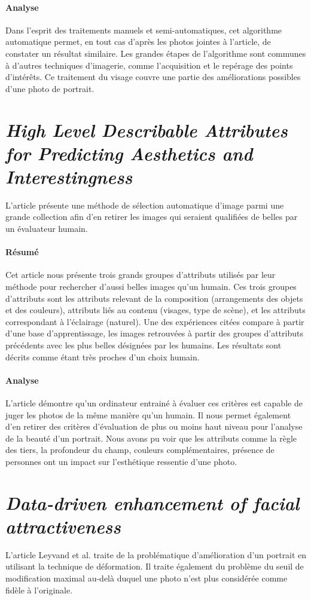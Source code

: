 \documentclass[11pt, french]{report-rd-info}
\begin{document}
\paragraph{Analyse}
Dans l'esprit des traitements manuels et semi-automatiques, cet algorithme automatique permet, en tout cas d'après les photos jointes à l'article, de constater un résultat similaire.
Les grandes étapes de l'algorithme sont communes à d'autres techniques d'imagerie, comme l'acquisition et le repérage des points d'intérêts.
Ce traitement du visage couvre une partie des améliorations possibles d'une photo de portrait.
\section{\emph{High Level Describable Attributes for Predicting Aesthetics and Interestingness}}
L'article \cite{Dhar}  présente une méthode de sélection automatique d'image parmi une grande collection afin d'en retirer les images qui seraient qualifiées de belles par un évaluateur humain.
\paragraph{Résumé}
Cet article nous présente trois grands groupes d'attributs utilisés par leur méthode pour rechercher d'aussi belles images qu'un humain.
Ces trois groupes d'attributs sont les attributs relevant de la composition (arrangements des objets et des couleurs), attributs liés au contenu (visages, type de scène), et les attributs correspondant à l'éclairage (naturel).
Une des expériences citées compare à partir d'une base d'apprentissage, les images retrouvées à partir des groupes d'attributs précédents avec les plus belles désignées par les humains. Les résultats sont décrits comme étant très proches d'un choix humain.
\paragraph{Analyse}
L'article démontre qu'un ordinateur entrainé à évaluer ces critères est capable de juger les photos de la même manière qu'un humain.
Il nous permet également d'en retirer des critères d'évaluation de plus ou moins haut niveau pour l'analyse de la beauté d'un portrait.
Nous avons pu voir que les attributs comme la règle des tiers, la profondeur du champ, couleurs complémentaires, présence de personnes ont un impact sur l'esthétique ressentie d'une photo.
\section{\emph{Data-driven enhancement of facial attractiveness}}
L'article Leyvand et al. \cite{Leyvand2008} traite de la problématique d'amélioration d'un portrait en utilisant la technique de déformation. Il traite également du problème du seuil de modification maximal au-delà duquel une photo n'est plus considérée comme fidèle à l'originale.
\end{document}

